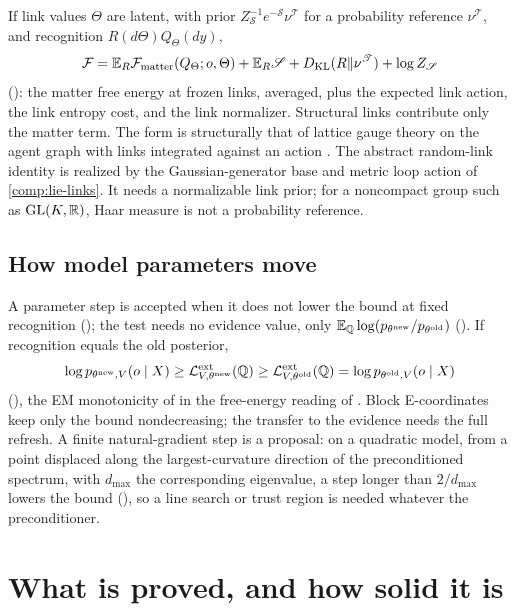 If link values $\Theta$ are latent, with prior $Z_{\mathscr S}^{-1}e^{-\mathscr S}\nu^{\mathscr T}$ for a
probability reference $\nu^{\mathscr T}$, and recognition $R(d\Theta)Q_\Theta(dy)$,
\[
\mathcal F=\mathbb E_R\mathcal F_{\mathrm{matter}}(Q_\Theta;o,\Theta)+\mathbb E_R\mathscr S+D_{\mathrm{KL}}(R\Vert\nu^{\mathscr T})+\log Z_{\mathscr S}
\]
(): the matter free energy at frozen links, averaged, plus the expected link
action, the link entropy cost, and the link normalizer. Structural links contribute only the matter term. The
form is structurally that of lattice gauge theory on the agent graph with links integrated against
an action \citep{Creutz1983}. The abstract random-link identity is realized by the Gaussian-generator
base and metric loop action of \cref{comp:lie-links}. It needs a normalizable link prior; for a
noncompact group such as $\mathrm{GL}(K,\mathbb R)$, Haar measure is not a probability reference.

\subsection{How model parameters move}
\label{comp:ch05-parameters}

A parameter step is accepted when it does not lower the bound at fixed recognition
(); the test needs no evidence value, only
$\mathbb E_{\mathbb Q}\log(p_{\theta^{\mathrm{new}}}/p_{\theta^{\mathrm{old}}})$ (). If
recognition equals the old posterior,
\[
\log p_{\theta^{\mathrm{new}},V}(o\mid X)\geq\mathcal L^{\mathrm{ext}}_{V,\theta^{\mathrm{new}}}(\mathbb Q)\geq\mathcal L^{\mathrm{ext}}_{V,\theta^{\mathrm{old}}}(\mathbb Q)=\log p_{\theta^{\mathrm{old}},V}(o\mid X)
\]
(), the EM monotonicity of \citet{Dempster1977} in the free-energy reading
of \citet{Neal1998}. Block E-coordinates keep only the bound nondecreasing; the transfer to the evidence needs the
full refresh. A finite natural-gradient step is a proposal: on a quadratic model, from a point displaced along the
largest-curvature direction of the preconditioned spectrum, with $d_{\max}$ the corresponding eigenvalue, a step
longer than $2/d_{\max}$ lowers the bound (), so a line search or trust
region is needed whatever the preconditioner.

\section{What is proved, and how solid it is}
\label{comp:ch05-status}

